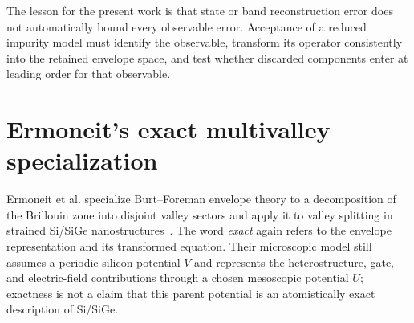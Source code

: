 The lesson for the present work is that state or band reconstruction error does
not automatically bound every observable error. Acceptance of a reduced impurity
model must identify the observable, transform its operator consistently into the
retained envelope space, and test whether discarded components enter at leading
order for that observable.

\section{Ermoneit's exact multivalley specialization}

Ermoneit et al. specialize Burt--Foreman envelope theory to a decomposition of
the Brillouin zone into disjoint valley sectors and apply it to valley splitting
in strained Si/SiGe nanostructures~\cite{ermoneit2026}. The word \emph{exact}
again refers to the envelope representation and its transformed equation. Their
microscopic model still assumes a periodic silicon potential $V$ and represents
the heterostructure, gate, and electric-field contributions through a chosen
mesoscopic potential $U$; exactness is not a claim that this parent potential is
an atomistically exact description of Si/SiGe.

